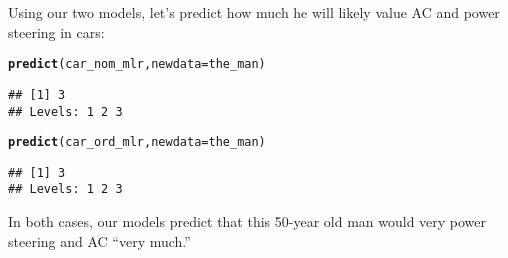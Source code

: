 \documentclass{article}\usepackage[]{graphicx}\usepackage[]{color}
\makeatletter
\newcommand{\hlstd}[1]{\textcolor[rgb]{0.345,0.345,0.345}{#1}}%
\newcommand{\hlkwc}[1]{\textcolor[rgb]{0.333,0.667,0.333}{#1}}%
\newcommand{\hlkwd}[1]{\textcolor[rgb]{0.737,0.353,0.396}{\textbf{#1}}}%
\newenvironment{kframe}{%
 \def\at@end@of@kframe{}%
 \ifinner\ifhmode%
  \def\at@end@of@kframe{\end{minipage}}%
  \begin{minipage}{\columnwidth}%
 \fi\fi%
 \def\FrameCommand##1{\hskip\@totalleftmargin \hskip-\fboxsep
 \colorbox{shadecolor}{##1}\hskip-\fboxsep
     \hskip-\linewidth \hskip-\@totalleftmargin \hskip\columnwidth}%
 \MakeFramed {\advance\hsize-\width
   \@totalleftmargin\z@ \linewidth\hsize
   \@setminipage}}%
 {\par\unskip\endMakeFramed%
 \at@end@of@kframe}
\newenvironment{knitrout}{}{} %
\makeatother
\begin{document}
Using our two models, let's predict how much he will likely value AC and power steering in cars:

\begin{knitrout}
\color{fgcolor}\begin{kframe}
\begin{alltt}
\hlkwd{predict}\hlstd{(car_nom_mlr,} \hlkwc{newdata} \hlstd{= the_man)}
\end{alltt}
\begin{verbatim}
## [1] 3
## Levels: 1 2 3
\end{verbatim}
\begin{alltt}
\hlkwd{predict}\hlstd{(car_ord_mlr,} \hlkwc{newdata} \hlstd{= the_man)}
\end{alltt}
\begin{verbatim}
## [1] 3
## Levels: 1 2 3
\end{verbatim}
\end{kframe}
\end{knitrout}

In both cases, our models predict that this 50-year old man would very power steering and AC ``very much.''
\end{document}
